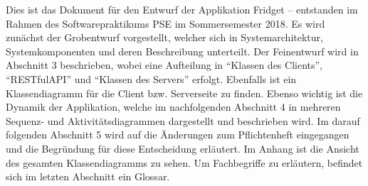 Dies ist das Dokument für den Entwurf der Applikation Fridget – entstanden im Rahmen des Softwarepraktikums PSE im Sommersemester 2018.
Es wird zunächst der Grobentwurf vorgestellt, welcher sich in Systemarchitektur, Systemkomponenten und deren Beschreibung unterteilt. 
Der Feinentwurf wird in Abschnitt 3 beschrieben, wobei eine Aufteilung in ``Klassen des Clients'', ``RESTfulAPI'' und ``Klassen des Servers'' erfolgt. Ebenfalls ist ein Klassendiagramm für die Client bzw. Serverseite zu finden. 
Ebenso wichtig ist die Dynamik der Applikation, welche im nachfolgenden Abschnitt 4 in mehreren Sequenz- und Aktivitätsdiagrammen dargestellt und beschrieben wird.  
Im darauf folgenden Abschnitt 5 wird auf die Änderungen zum Pflichtenheft eingegangen und die Begründung für diese Entscheidung erläutert.
Im Anhang ist die Ansicht des gesamten Klassendiagramms zu sehen.
Um Fachbegriffe zu erläutern, befindet sich im letzten Abschnitt ein Glossar.
